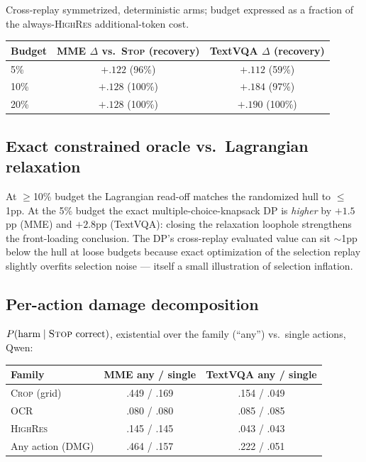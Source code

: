 \documentclass[10pt]{article}
\begin{document}
Cross-replay symmetrized, deterministic arms; budget expressed as a
fraction of the always-\textsc{HighRes} additional-token cost.

\begin{center}
\begin{tabular}{lcc}
\toprule
Budget & MME $\Delta$ vs.\ \textsc{Stop} (recovery) & TextVQA $\Delta$ (recovery) \\
\midrule
5\% & $+.122$ (96\%) & $+.112$ (59\%) \\
10\% & $+.128$ (100\%) & $+.184$ (97\%) \\
20\% & $+.128$ (100\%) & $+.190$ (100\%) \\
\bottomrule
\end{tabular}
\end{center}

\subsection{Exact constrained oracle vs.\ Lagrangian relaxation}
\label{sec:results:exact}

At $\ge$10\% budget the Lagrangian read-off matches the randomized hull to
$\le$1pp. At the 5\% budget the exact multiple-choice-knapsack DP is
\emph{higher} by $+1.5$pp (MME) and $+2.8$pp (TextVQA): closing the
relaxation loophole strengthens the front-loading conclusion. The DP's
cross-replay evaluated value can sit $\sim$1pp below the hull at loose
budgets because exact optimization of the selection replay slightly
overfits selection noise --- itself a small illustration of selection
inflation.

\subsection{Per-action damage decomposition}

$P(\text{harm} \mid \text{\textsc{Stop} correct})$, existential over the
family (``any'') vs.\ single actions, Qwen:

\begin{center}
\begin{tabular}{lcc}
\toprule
Family & MME any / single & TextVQA any / single \\
\midrule
\textsc{Crop} (grid) & .449 / .169 & .154 / .049 \\
\textsc{OCR} & .080 / .080 & .085 / .085 \\
\textsc{HighRes} & .145 / .145 & .043 / .043 \\
Any action (DMG) & .464 / .157 & .222 / .051 \\
\bottomrule
\end{tabular}
\end{center}
\end{document}
